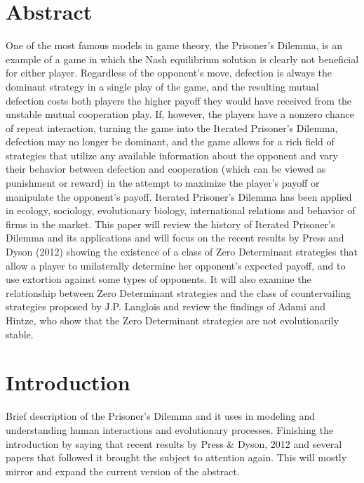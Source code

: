 
\chapter{Abstract}
One of the most famous models in game theory, the Prisoner's Dilemma, is an example of a game in which the Nash equilibrium solution is clearly not beneficial for either player. Regardless of the opponent's move, defection is always the dominant strategy in a single play of the game, and the resulting mutual defection costs both players the higher payoff they would have received from the unstable mutual cooperation play. If, however, the players have a nonzero chance of repeat interaction, turning the game into the Iterated Prisoner's Dilemma, defection may no longer be dominant, and the game allows for a rich field of strategies that utilize any available information about the opponent and vary their behavior between defection and cooperation (which can be viewed as punishment or reward) in the attempt to maximize the player's payoff or manipulate the opponent's payoff. Iterated Prisoner's Dilemma has been applied in ecology, sociology, evolutionary biology, international relations and behavior of firms in the market. This paper will review the history of Iterated Prisoner's Dilemma and its applications and will focus on the recent results by Press and Dyson (2012) showing the existence of a class of Zero Determinant strategies that allow a player to unilaterally determine her opponent's expected payoff, and to use extortion against some types of opponents. It will also examine the relationship between Zero Determinant strategies and the class of countervailing strategies proposed by J.P. Langlois and review the findings of Adami and Hintze, who show that the Zero Determinant strategies are not evolutionarily stable.

\chapter{Introduction}

Brief description of the Prisoner's Dilemma and it uses in modeling and understanding human interactions and evolutionary processes. Finishing the introduction by saying that recent results by Press \& Dyson, 2012 and several papers that followed it brought the subject to attention again. This will mostly mirror and expand the current version of the abstract.


